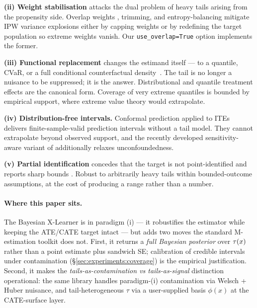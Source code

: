 \textbf{(ii) Weight stabilisation} attacks the dual problem of
heavy tails arising from the propensity side. Overlap weights
\citep{li2018balancing}, trimming, and entropy-balancing
mitigate IPW variance explosions either by capping weights or
by redefining the target population so extreme weights vanish.
Our \texttt{use\_overlap=True} option implements the former.

\textbf{(iii) Functional replacement} changes the estimand
itself --- to a quantile, CVaR, or a full conditional
counterfactual density~\citep{kallus2018policy}. The tail is
no longer a nuisance to be suppressed; it is the answer.
Distributional and quantile treatment effects are the canonical
form. Coverage of very extreme quantiles is bounded by empirical
support, where extreme value theory
\citep[EVT;][]{beirlant2006statistics} would extrapolate.

\textbf{(iv) Distribution-free intervals.} Conformal prediction
applied to ITEs
\citep{lei2021conformal,alaa2023conformal,jin2023sensitivity}
delivers finite-sample-valid prediction intervals without a tail
model. They cannot extrapolate beyond observed support, and the
recently developed sensitivity-aware variant of
\citet{jin2023sensitivity} additionally relaxes unconfoundedness.

\textbf{(v) Partial identification} concedes that the target is
not point-identified and reports sharp bounds
\citep{yadlowsky2022bounds}. Robust to arbitrarily heavy tails
within bounded-outcome assumptions, at the cost of producing a
range rather than a number.

\paragraph{Where this paper sits.}
The Bayesian X-Learner is in paradigm (i) --- it robustifies the
estimator while keeping the ATE/CATE target intact --- but adds two
moves the standard M-estimation toolkit does not. First, it returns
a \emph{full Bayesian posterior} over $\tau(x)$ rather than a point
estimate plus sandwich SE; calibration of credible intervals under
contamination (\S\ref{sec:experiments:coverage}) is the
empirical justification. Second, it makes the
\emph{tails-as-contamination vs tails-as-signal} distinction
operational: the same library handles paradigm-(i) contamination via
Welsch + Huber nuisance, and tail-heterogeneous $\tau$ via a
user-supplied basis $\phi(x)$ at the CATE-surface layer.

